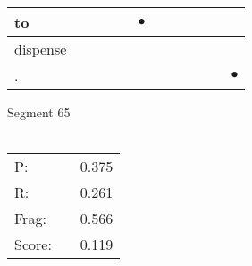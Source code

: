 \documentclass[landscape]{article}
\newcommand{\ssp}{\hspace{2pt}}
\newcommand{\mex}{\cellcolor{g}$\bullet$}
\begin{document}
\begin{tabular}{|l|p{10pt}|p{10pt}|p{10pt}|p{10pt}|p{10pt}|p{10pt}|p{10pt}|p{10pt}|p{10pt}|p{10pt}|p{10pt}|}
\hline
\ssp \cellcolor{ref4}to \ssp&\hspace{2pt}&\hspace{2pt}&\hspace{2pt}&\hspace{2pt}&\hspace{2pt}\mex&\hspace{2pt}&\hspace{2pt}&\hspace{2pt}&\hspace{2pt}&\hspace{2pt}&\hspace{2pt}\\
\hline
\ssp dispense \ssp&\hspace{2pt}&\hspace{2pt}&\hspace{2pt}&\hspace{2pt}&\hspace{2pt}&\hspace{2pt}&\hspace{2pt}&\hspace{2pt}&\hspace{2pt}&\hspace{2pt}&\hspace{2pt}\\
\hline
\ssp \cellcolor{ref10}. \ssp&\hspace{2pt}&\hspace{2pt}&\hspace{2pt}&\hspace{2pt}&\hspace{2pt}&\hspace{2pt}&\hspace{2pt}&\hspace{2pt}&\hspace{2pt}&\hspace{2pt}&\hspace{2pt}\mex\\
\hline
\end{tabular}

\vspace{6pt}
\noindent Segment 65\\\\
\noindent\begin{tabular}{lm{12pt}r}
\hline
P:&&0.375\\
R:&&0.261\\
Frag:&&0.566\\
Score:&&0.119\\
\end{tabular}
\end{document}
